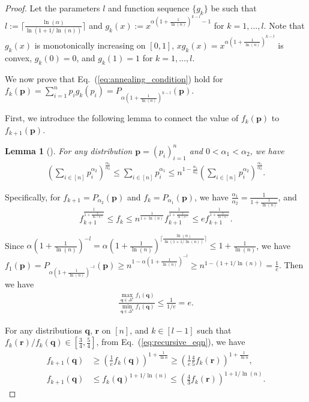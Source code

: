 \documentclass[journal]{IEEEtran}
\newtheorem{lemma}{Lemma}
\newcommand{\eq}[1]{Eq.~(\ref{eq:#1})}
\begin{document}
\begin{proof}
Let the parameters $l$ and function sequence $\{g_k\}$ be such that $l := \lceil \frac{\ln(\alpha)}{\ln(1+1/\ln(n))}\rceil$ and $g_k(x) := x^{\alpha(1+\frac{1}{\ln(n)})^{k-l}-1}$ for $k = 1,\ldots,l$. Note that $g_k(x)$ is monotonically increasing on $[0,1]$, $xg_k(x) = x^{\alpha(1+\frac{1}{\ln(n)})^{k-l}}$ is convex, $g_k(0) = 0$, and $g_k(1) = 1$ for $k = 1,\ldots,l$.

We now prove that \eq{annealing_condition} hold for $f_k(\mathbf{p}) = \sum_{i = 1}^n p_i g_k(p_i) = P_{\alpha(1+\frac{1}{\ln(n)})^{k-l}}(\mathbf{p})$.

First, we introduce the following lemma to connect the value of $f_k(\mathbf{p})$ to $f_{k+1}(\mathbf{p})$.

\begin{lemma}[{\cite[Lemma 5.3]{li2019entropy}}]
  For any distribution $\mathbf{p} = \left(p_{i}\right)_{i=1}^{n}$ and $0<\alpha_{1}<\alpha_{2}$, we have
\begin{align}
    \left(\sum_{i \in[n]} p_{i}^{\alpha_{2}}\right)^{\frac{\alpha_{1}}{\alpha_{2}}} \leq \sum_{i \in[n]} p_{i}^{\alpha_{1}} \leq n^{1-\frac{\alpha_{1}}{\alpha_{2}}}\left(\sum_{i \in[n]} p_{i}^{\alpha_{2}}\right)^{\frac{\alpha_{1}}{\alpha_{2}}}.
\end{align}
\end{lemma}

Specifically, for $f_{k+1} = P_{\alpha_2}(\mathbf{p})$ and $f_{k} = P_{\alpha_1}(\mathbf{p})$, we have  $\frac{\alpha_1}{\alpha_2} = \frac{1}{1+\frac{1}{\ln(n)}}$, and
\begin{equation}
  \label{eq:recursive_eqn}
  f_{k+1}^{\frac{1}{1+\frac{1}{\ln(n)}}} \le f_{k} \le n^{\frac{1}{1+\ln(n)}}f_{k+1}^{\frac{1}{1+\frac{1}{\ln(n)}}}\le ef_{k+1}^{\frac{1}{1+\frac{1}{\ln(n)}}}.
\end{equation}

Since  $\alpha (1+\frac{1}{\ln(n)})^{-l} = \alpha (1+\frac{1}{\ln(n)})^{\lceil \frac{\ln(\alpha)}{\ln(1+1/\ln(n))}\rceil} \le  1+\frac{1}{\ln(n)}$, we have $f_1(\mathbf{p}) = P_{\alpha (1+\frac{1}{\ln(n)})^{-l}}(\mathbf{p}) \ge n^{1-\alpha (1+\frac{1}{\ln(n)})^{-l}} \ge n^{1-(1+1/\ln(n))}  = \frac{1}{e}$. Then we have
\begin{align}
\label{eq:annealing_equation_1}
    \frac{\max_{\mathbf{q}\in\Delta^n}f_1(\mathbf{q})}{\min_{\mathbf{q}\in\Delta^n}f_1(\mathbf{q})} \le \frac{1}{1/e} = e.
\end{align}

For any distributions $\mathbf{q}$, $\mathbf{r}$ on $[n]$, and $k \in [l-1]$ such that $f_k(\mathbf{r})/f_k(\mathbf{q})\in[\frac{3}{4}, \frac{5}{4}]$, from \eq{recursive_eqn}, we have
\begin{align}
    f_{k+1}(\mathbf{q}) &\ge\left(\frac{1}{e}f_k(\mathbf{q})\right)^{1+\frac{1}{\ln n}}\ge \left(\frac{1}{e}\frac{4}{5}f_k(\mathbf{r})\right)^{1+\frac{1}{\ln n}}, \\
    f_{k+1}(\mathbf{q}) &\le f_k(\mathbf{q})^{1+1/\ln(n)}\le \left(\frac{4}{3}f_k(\mathbf{r})\right)^{1+1/\ln(n)}.
\end{align}


\end{proof}
\end{document}
